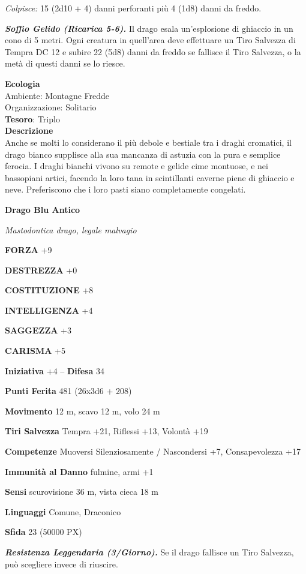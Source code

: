 \begin{multicols}{2}
\textit{Colpisce:} 15 (2d10 + 4) danni perforanti più 4 (1d8) danni da freddo.

\textit{\textbf{Soffio Gelido (Ricarica 5-6).}} Il drago esala un'esplosione di ghiaccio in un cono di 5 metri. Ogni creatura in quell'area deve effettuare un Tiro Salvezza di Tempra DC 12 e subire 22 (5d8) danni da freddo se fallisce il Tiro Salvezza, o la metà di questi danni se lo riesce.

\textbf{Ecologia}\\
Ambiente: Montagne Fredde\\
Organizzazione: Solitario\\
\textbf{Tesoro}: Triplo\\
\textbf{Descrizione}\\
Anche se molti lo considerano il più debole e bestiale tra i draghi cromatici, il drago bianco supplisce alla sua mancanza di astuzia con la pura e semplice ferocia. I draghi bianchi vivono su remote e gelide cime montuose, e nei bassopiani artici, facendo la loro tana in scintillanti caverne piene di ghiaccio e neve. Preferiscono che i loro pasti siano completamente congelati.

\medskip{}\textbf{Drago Blu Antico}

\textit{Mastodontica drago, legale malvagio}

\textbf{FORZA} +9

\textbf{DESTREZZA} +0

\textbf{COSTITUZIONE} +8

\textbf{INTELLIGENZA} +4

\textbf{SAGGEZZA} +3

\textbf{CARISMA} +5

\textbf{Iniziativa} +4 -- \textbf{Difesa} 34

\textbf{Punti Ferita} 481 (26x3d6 + 208)

\textbf{Movimento} 12 m, scavo 12 m, volo 24 m

\textbf{Tiri Salvezza} Tempra +21, Riflessi +13, Volontà +19

\textbf{Competenze} Muoversi Silenziosamente / Nascondersi +7, Consapevolezza +17

\textbf{Immunità al Danno} fulmine, armi +1

\textbf{Sensi} scurovisione 36 m, vista cieca 18 m

\textbf{Linguaggi} Comune, Draconico

\textbf{Sfida} 23 (50000 PX)

\textit{\textbf{Resistenza Leggendaria (3/Giorno).}} Se il drago fallisce un Tiro Salvezza, può scegliere invece di riuscire.


\end{multicols}
